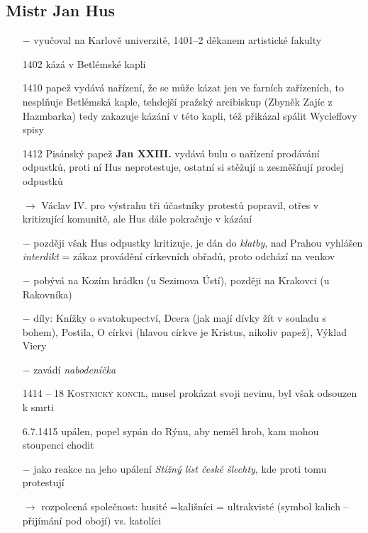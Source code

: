 \documentclass{article}
\begin{document}
\subsection*{Mistr Jan Hus}
\begin{itemize}
    \vspace{-0.5em}
    \setlength\itemsep{0.15em}
    \item[$-$] vyučoval na Karlově univerzitě, 1401--2 děkanem artistické fakulty
    \item[1402] kázá v Betlémské kapli
    \item[1410] papež vydává nařízení, že se může kázat jen ve farních zařízeních, to nesplňuje Betlémská kaple, tehdejší pražský arcibiskup (Zbyněk Zajíc z Hazmbarka) tedy zakazuje kázání v této kapli, též přikázal spálit Wycleffovy spisy
    \item[1412] Pisánský papež \textbf{Jan XXIII.} vydává bulu o nařízení prodávání odpustků, proti ní Hus neprotestuje, ostatní si stěžují a zesměšňují prodej odpustků
    \item[$\rightarrow$] Václav IV. pro výstrahu tři účastníky protestů popravil, otřes v kritizující komunitě, ale Hus dále pokračuje v kázání
    \item[$-$] později však Hus odpustky kritizuje, je dán do \textit{klatby}, nad Prahou vyhlášen \textit{interdikt} = zákaz provádění církevních obřadů, proto odchází na venkov
    \item[$-$] pobývá na Kozím hrádku (u Sezimova Ústí), později na Krakovci (u Rakovníka)
    \item[$-$] díly: Knížky o svatokupectví, Dcera (jak mají dívky žít v souladu s bohem), Postila, O církvi (hlavou církve je Kristus, nikoliv papež), Výklad Viery
    \item[$-$] zavádí \textit{nabodeníčka}
    \item[1414 -- 18] \textsc{Kostnický koncil}, musel prokázat svoji nevinu, byl však odsouzen k smrti
    \item[6.7.1415] upálen, popel sypán do Rýnu, aby neměl hrob, kam mohou stoupenci chodit
    \item[$-$] jako reakce na jeho upálení \textit{Stížný list české šlechty}, kde proti tomu protestují
    \item[$\rightarrow$] rozpolcená společnost: husité =kališníci = ultrakvisté (symbol kalich -- přijímání pod obojí) vs. katolíci
\end{itemize}
\end{document}
